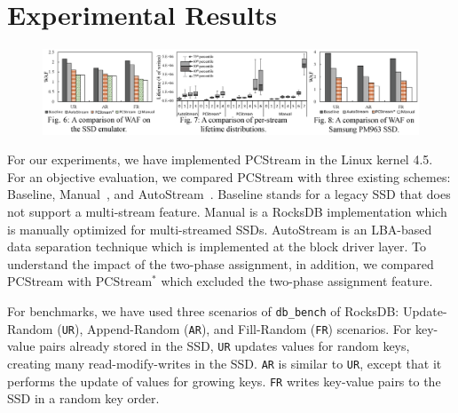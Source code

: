 \vspace{-10pt}
\section{Experimental Results}
\vspace{-5pt}

\begin{figure}[t]
	\centering
	\vspace{-3pt}
	\includegraphics[width=1\textwidth]{figure/expfig}
	\label{fig:exp}
	\vspace{-35pt}
\end{figure}

For our experiments, we have implemented \textsf{\small PCStream} in the Linux kernel
4.5.  For an objective evaluation, we compared \textsf{\small PCStream} with three
existing schemes: \textsf{\small Baseline}, \textsf{\small Manual}~\cite{MultiStream}, and
\textsf{\small AutoStream}~\cite{AutoStream}.  \textsf{\small Baseline} stands for a legacy
SSD that does not support a multi-stream feature. \textsf{\small Manual} is a RocksDB
implementation which is manually optimized for multi-streamed SSDs.
\textsf{\small AutoStream} is an LBA-based data separation technique which is
implemented at the block driver layer. To understand the impact of the
two-phase assignment, in addition, we compared \textsf{\small PCStream} with
\textsf{\small PCStream$^{*}$} which excluded the two-phase assignment feature.

For benchmarks, we have used three scenarios of \texttt{db\_bench} of RocksDB:
Update-Random (\texttt{UR}), Append-Random (\texttt{AR}), and Fill-Random
(\texttt{FR}) scenarios.  For key-value pairs already stored in the SSD,
\texttt{UR} updates values for random keys, creating many
read-modify-writes in the SSD.  \texttt{AR} is similar to \texttt{UR}, except
that it performs the update of values for growing keys. \texttt{FR} writes
key-value pairs to the SSD in a random key order.

